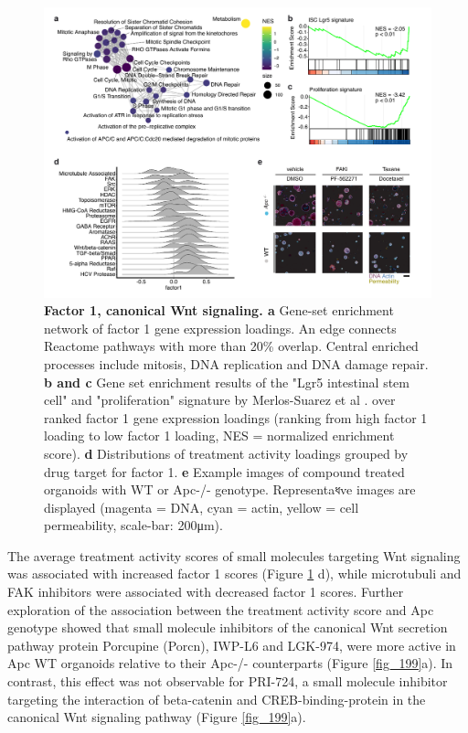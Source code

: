 \begin{flushleft}
\begin{figure}[h!]
\centering
\includegraphics[width=\textwidth,
                height=\textheight,
                keepaspectratio]{figures/adenomaprofiling/pdf/fig_2_1.pdf}
\caption{\textbf{Factor 1, canonical Wnt signaling. a} Gene-set enrichment network of factor 1 gene expression loadings. An edge connects Reactome pathways with more than 20\% overlap. Central enriched processes include mitosis, DNA replication and DNA damage repair. \textbf{b and c} Gene set enrichment results of the "Lgr5 intestinal stem cell" and "proliferation" signature by Merlos-Suarez et al \cite{Merlos-Suarez2011-gd}. over ranked factor 1 gene expression loadings (ranking from high factor 1 loading to low factor 1 loading, NES = normalized enrichment score). \textbf{d} Distributions of treatment activity loadings grouped by drug target for factor 1. \textbf{e} Example images of compound treated organoids with WT or Apc-/- genotype. Representaধve images are displayed (magenta = DNA, cyan = actin, yellow = cell permeability, scale-bar: 200μm).}
\label{fig_190}
\end{figure}
\bigbreak

The average treatment activity scores of small molecules targeting Wnt signaling was associated with increased factor 1 scores (Figure \ref{fig_190} d), while microtubuli and FAK inhibitors were associated with decreased factor 1 scores. Further exploration of the association between the treatment activity score and Apc genotype showed that small molecule inhibitors of the canonical Wnt secretion pathway protein Porcupine (Porcn), IWP-L6 and LGK-974, were more active in Apc WT organoids relative to their Apc-/- counterparts \cite{Liu2013-dh} (Figure \ref{fig_199}a). In contrast, this effect was not observable for PRI-724, a small molecule inhibitor targeting the interaction of beta-catenin and CREB-binding-protein in the canonical Wnt signaling pathway \cite{Okazaki2019-gy} (Figure \ref{fig_199}a). 


\end{flushleft}
